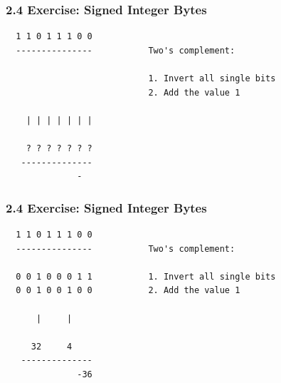 \begin{frame}[fragile]
  \frametitle{2.4 Exercise: Signed Integer Bytes}
  \begin{verbatim}
  1 1 0 1 1 1 0 0
  ---------------           Two's complement:

                            1. Invert all single bits
                            2. Add the value 1
    
    | | | | | | |

    ? ? ? ? ? ? ?
   --------------
              -
  \end{verbatim}
\end{frame}


\begin{frame}[fragile]
  \frametitle{2.4 Exercise: Signed Integer Bytes}
  \begin{verbatim}
  1 1 0 1 1 1 0 0
  ---------------           Two's complement:

  0 0 1 0 0 0 1 1           1. Invert all single bits
  0 0 1 0 0 1 0 0           2. Add the value 1
    
      |     |

     32     4
   --------------
              -36
  \end{verbatim}
\end{frame}


